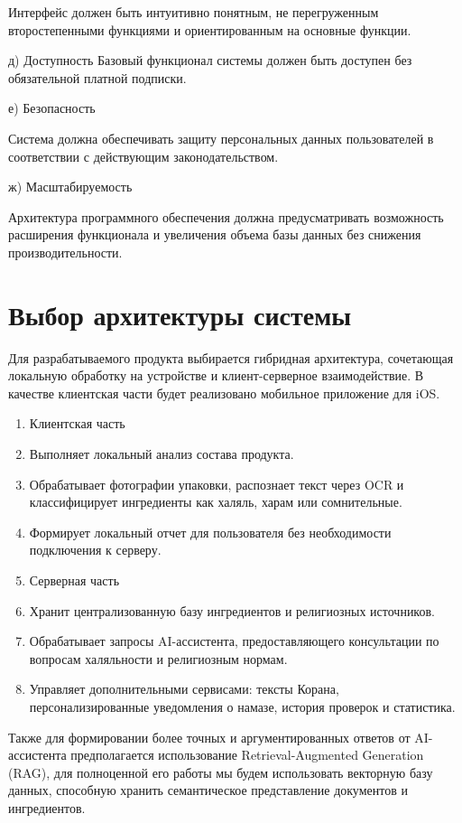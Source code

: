 Интерфейс должен быть интуитивно понятным, не перегруженным второстепенными функциями и ориентированным на основные функции.


д) Доступность Базовый функционал системы должен быть доступен без обязательной платной подписки.


е) Безопасность


Система должна обеспечивать защиту персональных данных пользователей в соответствии с действующим законодательством.


ж) Масштабируемость


Архитектура программного обеспечения должна предусматривать возможность расширения функционала и увеличения объема базы данных без снижения производительности.


\section{Выбор архитектуры системы}


Для разрабатываемого продукта выбирается гибридная архитектура, сочетающая локальную обработку на устройстве и клиент-серверное взаимодействие. В качестве клиентская части будет реализовано мобильное приложение для iOS.

\begin{enumerate}
	\item Клиентская часть
	\item Выполняет локальный анализ состава продукта.
	\item Обрабатывает фотографии упаковки, распознает текст через OCR и классифицирует ингредиенты как халяль, харам или сомнительные.
	\item Формирует локальный отчет для пользователя без необходимости подключения к серверу.
	\item Серверная часть
	\item Хранит централизованную базу ингредиентов и религиозных источников.
	\item Обрабатывает запросы AI-ассистента, предоставляющего консультации по вопросам халяльности и религиозным нормам.
	\item Управляет дополнительными сервисами: тексты Корана, персонализированные уведомления о намазе, история проверок и статистика.
\end{enumerate}

Также для формировании более точных и аргументированных ответов от AI-ассистента предполагается использование Retrieval-Augmented Generation (RAG), для полноценной его работы мы будем использовать векторную базу данных, способную хранить семантическое представление документов и ингредиентов.


